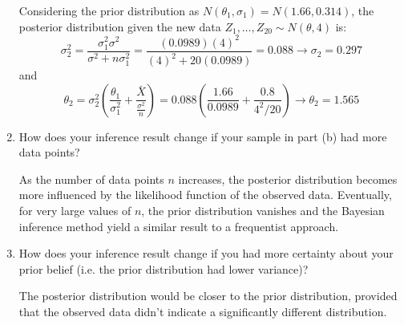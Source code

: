 \documentclass{article}
\begin{document}
\begin{enumerate}[label={(\alph*)}]
    Considering the prior distribution as $N(\theta_1, \sigma_1) = N(1.66,0.314)$, the 
    posterior distribution given the new data $Z_1, \ldots, Z_{20} \sim N(\theta,4)$ is:
    \[
        \sigma_2^2 = \dfrac{\sigma_1^2\sigma^2}{\sigma^2 + n\sigma_1^2} = 
        \dfrac{(0.0989)(4)^2}{(4)^2 + 20(0.0989)} = 0.088 
        \rightarrow \boxed{\sigma_2 = 0.297}
    \]
    and
    \[
        \theta_2 = \sigma_2^2 \left(\dfrac{\theta_1}{\sigma_1^2} + \dfrac{\bar{X}}{\frac{\sigma^2}{n}}\right) =
        0.088 \left(\dfrac{1.66}{0.0989} + \dfrac{0.8}{4^2/20}\right) 
        \rightarrow \boxed{\theta_2= 1.565} 
    \]
    \item How does your inference result change if your sample in part (b) had
    more data points?
    
    As the number of data points $n$ increases, the posterior distribution becomes more influenced by the likelihood function of the observed data. Eventually, for very large values of $n$, the prior distribution vanishes and the Bayesian inference method yield a similar result to a frequentist approach.
    \item How does your inference result change if you had more certainty about
    your prior belief (i.e. the prior distribution had lower variance)?
    
    The posterior distribution would be closer to the prior distribution, provided that
    the observed data didn't indicate a significantly different distribution. 
    
%
%
%
%
%
    
\end{enumerate}

%
%
\end{document}
